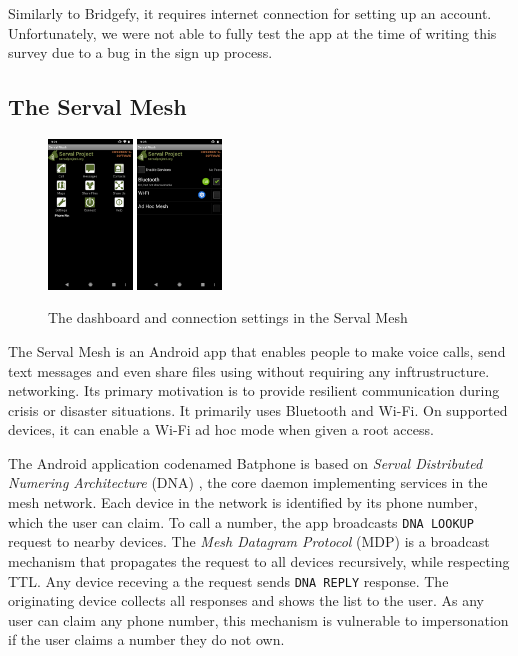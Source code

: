 \documentclass[conference,compsoc]{IEEEtran}
\begin{document}
Similarly to Bridgefy, it requires internet connection for setting up an account. Unfortunately, we were not able to fully test the app at the time of writing this survey due to a bug in the sign up process.

\subsection{The Serval Mesh}

\begin{figure}[h]
  \centering
  \includegraphics[width=0.2\textwidth]{serval1} \includegraphics[width=0.2\textwidth]{serval2}
  \caption{The dashboard and connection settings in the Serval Mesh}
\end{figure}

The Serval Mesh \cite{serval} is an Android app that enables people to make voice calls, send text messages and even share files using without requiring any inftrustructure. networking. Its primary motivation is to provide resilient communication during crisis or disaster situations. It primarily uses Bluetooth and Wi-Fi. On supported devices, it can enable a Wi-Fi ad hoc mode when given a root access.

The Android application codenamed Batphone is based on \textit{Serval Distributed Numering Architecture} (DNA) \cite{servaldna}, the core daemon implementing services in the mesh network. Each device in the network is identified by its phone number, which the user can claim. To call a number, the app broadcasts \texttt{DNA LOOKUP} request to nearby devices. The \textit{Mesh Datagram Protocol} (MDP) is a broadcast mechanism that propagates the request to all devices recursively, while respecting TTL. Any device receving a the request sends \texttt{DNA REPLY} response. The originating device collects all responses and shows the list to the user. As any user can claim any phone number, this mechanism is vulnerable to impersonation if the user claims a number they do not own.
\end{document}
